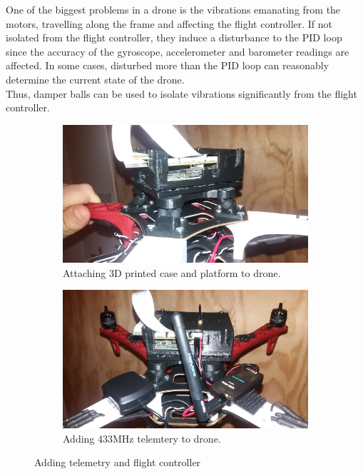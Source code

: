 One of the biggest problems in a drone is the vibrations emanating from the motors, travelling along the frame and affecting the flight controller. If not isolated from the flight controller, they induce a disturbance to the PID loop since the accuracy of the gyroscope, accelerometer and barometer readings are affected. In some cases, disturbed more than the PID loop can reasonably determine the current state of the drone.\\

Thus, damper balls can be used to isolate vibrations significantly from the flight controller.

\begin{figure}[H]
\begin{subfigure}{0.5\textwidth}
\centering
\includegraphics[scale=0.1]{images/drone-build-case-ondrone.jpg}
\caption{Attaching 3D printed case and platform to drone.}
\label{fig:attach_case_drone}
\end{subfigure}
\begin{subfigure}{0.5\textwidth}
\centering
\includegraphics[scale=0.1]{images/drone-build-433.jpg}
\caption{Adding 433MHz telemtery to drone.}
\label{fig:attach_433}
\end{subfigure}
\caption{Adding telemetry and flight controller}
\label{fig:attach_case_433}
\end{figure}

